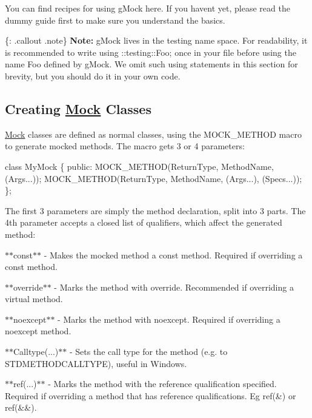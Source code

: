 You can find recipes for using g\+Mock here. If you haven\textquotesingle{}t yet, please read the dummy guide first to make sure you understand the basics.

\{\+: .callout .note\} {\bfseries Note\+:} g\+Mock lives in the {\ttfamily testing} name space. For readability, it is recommended to write {\ttfamily using \+::testing\+::\+Foo;} once in your file before using the name {\ttfamily Foo} defined by g\+Mock. We omit such {\ttfamily using} statements in this section for brevity, but you should do it in your own code.

\subsection*{Creating \mbox{\hyperlink{classMock}{Mock}} Classes}

\mbox{\hyperlink{classMock}{Mock}} classes are defined as normal classes, using the {\ttfamily M\+O\+C\+K\+\_\+\+M\+E\+T\+H\+OD} macro to generate mocked methods. The macro gets 3 or 4 parameters\+:


\begin{DoxyCode}
\textcolor{keyword}{class }MyMock \{
 \textcolor{keyword}{public}:
  MOCK\_METHOD(ReturnType, MethodName, (Args...));
  MOCK\_METHOD(ReturnType, MethodName, (Args...), (Specs...));
\};
\end{DoxyCode}


The first 3 parameters are simply the method declaration, split into 3 parts. The 4th parameter accepts a closed list of qualifiers, which affect the generated method\+:


\begin{DoxyItemize}
\item $\ast$$\ast${\ttfamily const}$\ast$$\ast$ -\/ Makes the mocked method a {\ttfamily const} method. Required if overriding a {\ttfamily const} method.
\item $\ast$$\ast${\ttfamily override}$\ast$$\ast$ -\/ Marks the method with {\ttfamily override}. Recommended if overriding a {\ttfamily virtual} method.
\item $\ast$$\ast${\ttfamily noexcept}$\ast$$\ast$ -\/ Marks the method with {\ttfamily noexcept}. Required if overriding a {\ttfamily noexcept} method.
\item $\ast$$\ast${\ttfamily Calltype(...)}$\ast$$\ast$ -\/ Sets the call type for the method (e.\+g. to {\ttfamily S\+T\+D\+M\+E\+T\+H\+O\+D\+C\+A\+L\+L\+T\+Y\+PE}), useful in Windows.
\item $\ast$$\ast${\ttfamily ref(...)}$\ast$$\ast$ -\/ Marks the method with the reference qualification specified. Required if overriding a method that has reference qualifications. Eg {\ttfamily ref(\&)} or {\ttfamily ref(\&\&)}.
\end{DoxyItemize}

